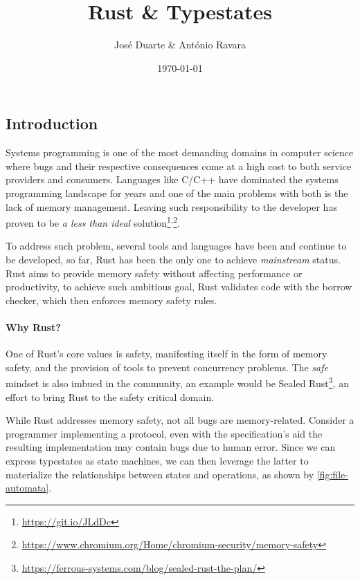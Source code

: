 \documentclass[a4paper, 10pt]{article}
\title{Rust \& Typestates}
\date{\today}
\author{José Duarte \& António Ravara}
\begin{document}
\maketitle

\subsection*{Introduction}
Systems programming is one of the most demanding domains in computer science where
bugs and their respective consequences come at a high cost to both service providers and consumers.
Languages like C/C++ have dominated the systems programming landscape for years and
one of the main problems with both is the lack of memory management.
Leaving such responsibility to the developer has proven to be \emph{a less than ideal}
solution\footnote{\url{https://git.io/JLdDc}}\textsuperscript{,}\footnote{\url{https://www.chromium.org/Home/chromium-security/memory-safety}}.

To address such problem, several tools and languages have been and continue to be developed,
so far, Rust has been the only one to achieve \emph{mainstream} status.
Rust aims to provide memory safety without affecting performance or productivity,
to achieve such ambitious goal, Rust validates code with the borrow checker, which then enforces memory safety rules.

\paragraph{Why Rust?}
One of Rust's core values is safety,
manifesting itself in the form of memory safety,
and the provision of tools to prevent concurrency problems.
The \emph{safe} mindset is also imbued in the community,
an example would be Sealed Rust\footnote{\url{https://ferrous-systems.com/blog/sealed-rust-the-plan/}},
an effort to bring Rust to the safety critical domain.

While Rust addresses memory safety, not all bugs are memory-related.
Consider a programmer implementing a protocol, even with the specification's aid the resulting implementation may contain bugs due to human error.
Since we can express typestates as state machines, we can then leverage the latter to materialize the relationships between states and operations,
as shown by \autoref{fig:file-automata}.
\end{document}

